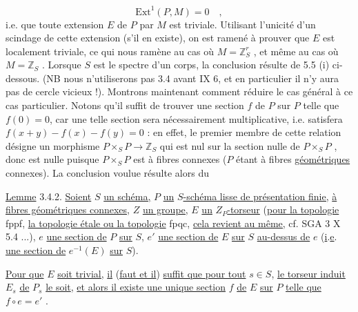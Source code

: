 \begin{equation*}
\mathrm{Ext}^1(P,M) = 0 \quad ,
\end{equation*}
i.e. que toute extension $E$ de $P$ par $M$ est triviale. Utilisant l'unicité d'un scindage de cette extension (s'il en existe), on est ramené à prouver que $E$ est localement triviale, ce qui nous ramène au cas où $M = \mathbb{Z}^{r}_{S}$ , et même au cas où $M = \mathbb{Z}_{S}$ . Lorsque $S$ est le spectre d'un corps, la conclusion résulte de 5.5 (i) ci-dessous. (NB nous n'utiliserons pas 3.4 avant IX 6, et en particulier il n'y aura pas de cercle vicieux !). Montrons maintenant comment réduire le cas général à ce cas particulier. Notons qu'il suffit de trouver une section $f$ de $P$ sur $P$ telle que $f(0) = 0$, car une telle section sera nécessairement multiplicative, i.e. satisfera $f(x+y)-f(x)-f(y) = 0$ : en effet, le premier membre de cette relation désigne un morphisme $P \times_{S} P \longrightarrow \mathbb{Z}_{S}$ qui est nul sur la section nulle de $P \times_{S} P$ , donc est nulle puisque $P \times_{S} P$ est à fibres connexes ($P$ étant à fibres \underline{géométriques} connexes). La conclusion voulue résulte alors du

\underline{Lemme} 3.4.2. \underline{Soient} $S$ \underline{un schéma,} $P$ \underline{un} \underline{$S$-schéma lisse de présentation finie,} \underline{à fibres géométriques connexes,} $Z$ \underline{un groupe,} $E$ \underline{un} $Z_{P}$\underline{-torseur} (\underline{pour la topologie} fppf, \underline{la topologie étale ou la topologie} fpqc, \underline{cela revient au même,} cf. SGA 3 X 5.4 ...), $e$ \underline{une section de} $P$ \underline{sur} $S$, $e'$ \underline{une section de} $E$ \underline{sur} $S$ \underline{au-dessus de} $e$ (\underline{i}.\underline{e}. \underline{une section de} $e^{-1}(E)$ \underline{sur} $S$).



\underline{Pour que} $E$ \underline{soit trivial,} \underline{il} (\underline{faut et il}) \underline{suffit que pour tout} $s \in S$, \underline{le torseur induit} $E_{s}$ \underline{de} $P_{s}$ \underline{le soit}, \underline{et alors il existe une unique section} $f$ \underline{de} $E$ \underline{sur} $P$ \underline{telle que} $f \circ e = e'$ .

